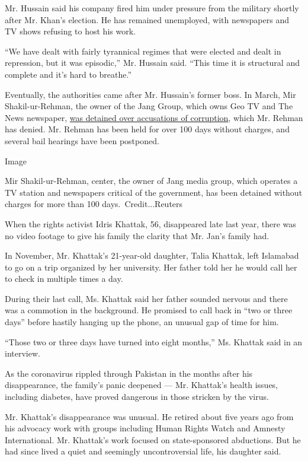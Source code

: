 Mr. Hussain said his company fired him under pressure from the military
shortly after Mr. Khan's election. He has remained unemployed, with
newspapers and TV shows refusing to host his work.

``We have dealt with fairly tyrannical regimes that were elected and
dealt in repression, but it was episodic,'' Mr. Hussain said. ``This
time it is structural and complete and it's hard to breathe.''

Eventually, the authorities came after Mr. Hussain's former boss. In
March, Mir Shakil-ur-Rehman, the owner of the Jang Group, which owns Geo
TV and The News newspaper,
\href{https://www.nytimes3xbfgragh.onion/2020/03/12/world/asia/pakistan-journalist-jang.html}{was
detained over accusations of corruption}, which Mr. Rehman has denied.
Mr. Rehman has been held for over 100 days without charges, and several
bail hearings have been postponed.

Image

Mir Shakil-ur-Rehman, center, the owner of Jang media group, which
operates a TV station and newspapers critical of the government, has
been detained without charges for more than 100 days.~Credit...Reuters

When the rights activist Idris Khattak, 56, disappeared late last year,
there was no video footage to give his family the clarity that Mr. Jan's
family had.

In November, Mr. Khattak's 21-year-old daughter, Talia Khattak, left
Islamabad to go on a trip organized by her university. Her father told
her he would call her to check in multiple times a day.

During their last call, Ms. Khattak said her father sounded nervous and
there was a commotion in the background. He promised to call back in
``two or three days'' before hastily hanging up the phone, an unusual
gap of time for him.

``Those two or three days have turned into eight months,'' Ms. Khattak
said in an interview.

As the coronavirus rippled through Pakistan in the months after his
disappearance, the family's panic deepened --- Mr. Khattak's health
issues, including diabetes, have proved dangerous in those stricken by
the virus.

Mr. Khattak's disappearance was unusual. He retired about five years ago
from his advocacy work with groups including Human Rights Watch and
Amnesty International. Mr. Khattak's work focused on state-sponsored
abductions. But he had since lived a quiet and seemingly uncontroversial
life, his daughter said.

